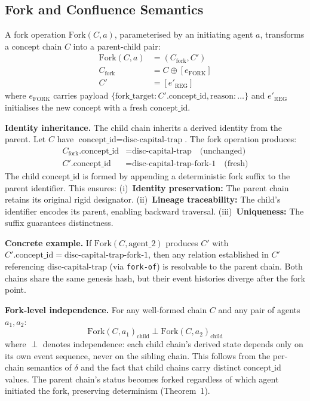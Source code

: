 \subsection{Fork and Confluence Semantics}

A fork operation $\text{Fork}(C, a)$, parameterised by an initiating agent $a$, transforms a concept chain $C$ into a parent-child pair:
\begin{align}
    \text{Fork}(C, a) &= (C_{\text{fork}}, C') \\
    C_{\text{fork}} &= C \oplus [e_{\text{FORK}}] \\
    C' &= [e'_{\text{REG}}]
\end{align}
where $e_{\text{FORK}}$ carries payload $\{\text{fork\_target}: C'.\text{concept\_id}, \text{reason}: \dots\}$ and $e'_{\text{REG}}$ initialises the new concept with a fresh $\text{concept\_id}$.

\textbf{Identity inheritance.} The child chain inherits a derived identity from the parent. Let $C$ have $\text{concept\_id} = \text{disc-capital-trap}$. The fork operation produces:
\begin{align}
    C_{\text{fork}}.\text{concept\_id} &= \text{disc-capital-trap} \quad \text{(unchanged)} \\
    C'.\text{concept\_id} &= \text{disc-capital-trap-fork-1} \quad \text{(fresh)}
\end{align}
The child $\text{concept\_id}$ is formed by appending a deterministic fork suffix to the parent identifier. This ensures: (i)~\textbf{Identity preservation:} The parent chain retains its original rigid designator. (ii)~\textbf{Lineage traceability:} The child's identifier encodes its parent, enabling backward traversal. (iii)~\textbf{Uniqueness:} The suffix guarantees distinctness.

\textbf{Concrete example.} If $\text{Fork}(C, \text{agent\_2})$ produces $C'$ with $C'.\text{concept\_id} = \text{disc-capital-trap-fork-1}$, then any relation established in $C'$ referencing $\text{disc-capital-trap}$ (via \texttt{fork-of}) is resolvable to the parent chain. Both chains share the same genesis hash, but their event histories diverge after the fork point.

\textbf{Fork-level independence.} For any well-formed chain $C$ and any pair of agents $a_1, a_2$:
$$\text{Fork}(C, a_1)_{\text{child}} \perp \text{Fork}(C, a_2)_{\text{child}}$$
where $\perp$ denotes independence: each child chain's derived state depends only on its own event sequence, never on the sibling chain. This follows from the per-chain semantics of $\delta$ and the fact that child chains carry distinct $\text{concept\_id}$ values. The parent chain's status becomes $\text{forked}$ regardless of which agent initiated the fork, preserving determinism (Theorem~1).

